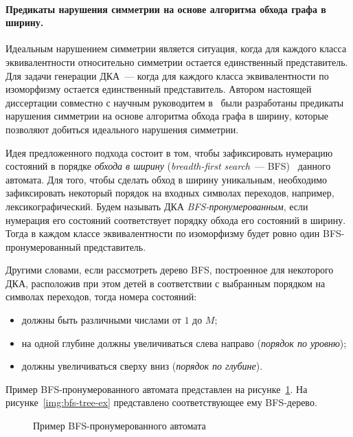 \paragraph*{Предикаты нарушения симметрии на основе алгоритма обхода графа в ширину.}
\label{sec:review:sym-breaking:bfs-based}
Идеальным нарушением симметрии является ситуация, когда для каждого класса эквивалентности относительно симметрии остается единственный представитель. 
Для задачи генерации ДКА~{---} когда для каждого класса эквивалентности по изоморфизму остается единственный представитель.
Автором настоящей диссертации совместно с научным руководитем в~\cite{zakirzyanov2015LATA} были разработаны предикаты нарушения симметрии на основе алгоритма обхода графа в ширину, которые позволяют добиться идеального нарушения симметрии.

Идея предложенного подхода состоит в том, чтобы зафиксировать нумерацию состояний в порядке \emph{обхода в ширину} (\emph{breadth-first search}~{---} BFS)~\cite{DBLP:books/mg/CormenLRS01-bfs} данного автомата.
Для того, чтобы сделать обход в ширину уникальным, необходимо зафиксировать некоторый порядок на входных символах переходов, например, лексикографический. 
Будем называть ДКА \emph{BFS-пронумерованным}, если нумерация его состояний соответствует порядку обхода его состояний в ширину.
Тогда в каждом классе эквивалентности по изоморфизму будет ровно один BFS-пронумерованный представитель.

Другими словами, если рассмотреть дерево BFS, построенное для некоторого ДКА, расположив при этом детей в соответствии с выбранным порядком на символах переходов, тогда номера состояний:
\begin{itemize}
  \item должны быть различными числами от $1$ до $M$;
  \item на одной глубине должны увеличиваться слева направо (\emph{порядок по уровню});
  \item должны увеличиваться сверху вниз (\emph{порядок по глубине}).
\end{itemize}
Пример BFS-пронумерованного автомата представлен на рисунке~\ref{img:bfs-ex}.
На рисунке~\ref{img:bfs-tree-ex} представлено соответствующее ему BFS-дерево.

\begin{figure}[ht]
  \centering
  \ifafour
    
  \else
    
  \fi
  \caption{Пример BFS-пронумерованного автомата}
  \label{img:bfs-ex}
\end{figure}

